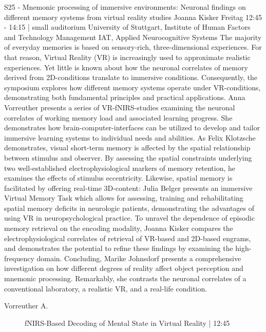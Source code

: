 
            \begin{symposium}
            {S25 - Mnemonic processing of immersive environments: Neuronal findings on different memory systems from virtual reality studies }
            { Joanna Kisker }
            {Freitag 12:45 - 14:15 | small auditorium}
            {University of Stuttgart, Institute of Human Factors and Technology Management IAT, Applied Neurocognitive Systems}
            The majority of everyday memories is based on sensory-rich, three-dimensional experiences. For that reason, Virtual Reality (VR) is increasingly used to approximate realistic experiences. Yet little is known about how the neuronal correlates of memory derived from 2D-conditions translate to immersive conditions. Consequently, the symposium explores how different memory systems operate under VR-conditions, demonstrating both fundamental principles and practical applications. 
Anna Vorreuther presents a series of VR-fNIRS-studies examining the neuronal correlates of working memory load and associated learning progress. She demonstrates how brain-computer-interfaces can be utilized to develop and tailor immersive learning systems to individual needs and abilities. 
As Felix Klotzsche demonstrates, visual short-term memory is affected by the spatial relationship between stimulus and observer. By assessing the spatial constraints underlying two well-established electrophysiological markers of memory retention, he examines the effects of stimulus eccentricity. 
Likewise, spatial memory is facilitated by offering real-time 3D-content: Julia Belger presents an immersive Virtual Memory Task which allows for assessing, training and rehabilitating spatial memory deficits in neurologic patients, demonstrating the advantages of using VR in neuropsychological practice.
To unravel the dependence of episodic memory retrieval on the encoding modality, Joanna Kisker compares the electrophysiological correlates of retrieval of VR-based and 2D-based engrams, and demonstrates the potential to refine these findings by examining the high-frequency domain.
Concluding, Marike Johnsdorf presents a comprehensive investigation on how different degrees of reality affect object perception and mnemonic processing. Remarkably, she contrasts the neuronal correlates of a conventional laboratory, a realistic VR, and a real-life condition.
            \begin{description}    
            
                \item [ Vorreuther A.] fNIRS-Based Decoding of Mental State in Virtual Reality \textcolor{mygray}{ | 12:45}    
                

\end{description}
\end{symposium}
